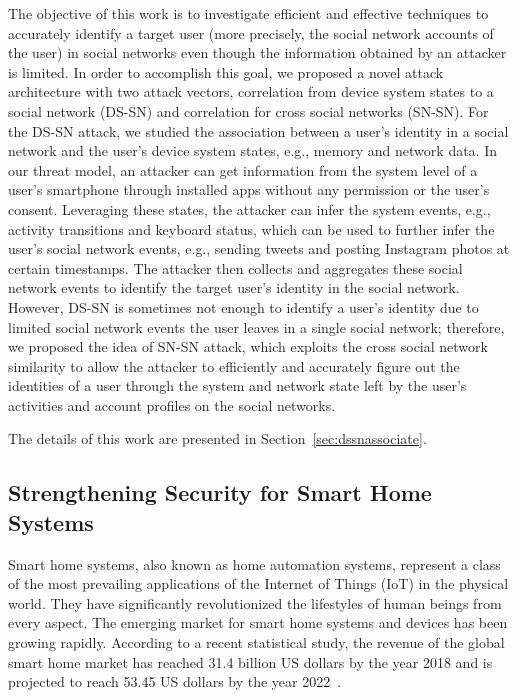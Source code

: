 \documentclass[letterpaper,12pt]{article}
\begin{document}
The objective of this work is to investigate efficient and effective techniques to accurately identify a target user (more precisely, the social network accounts of the user) in social networks even though the information obtained by an attacker is limited. 
In order to accomplish this goal, we proposed a novel attack architecture with two attack vectors, correlation from device system states to a social network (DS-SN) and correlation for cross social networks (SN-SN). For the DS-SN attack, we studied the association between a user's identity in a social network and the user's device system states, e.g., memory and network data. In our threat model, an attacker can get information from the system level of a user's smartphone through installed apps without any permission or the user's consent. Leveraging these states, the attacker can infer the system events, e.g., activity transitions and keyboard status, which can be used to further infer the user's social network events, e.g., sending tweets and posting Instagram photos at certain timestamps. The attacker then collects and aggregates these social network events to identify the target user's identity in the social network. However, DS-SN is sometimes not enough to identify a user's identity due to limited social network events the user leaves in a single social network; therefore, we proposed the idea of SN-SN attack, which exploits the cross social network similarity to allow the attacker to efficiently and accurately figure out the identities of a user through the system and network state left by the user's activities and account profiles on the social networks. 

The details of this work are presented in Section~\ref{sec:dssnassociate}. 

\subsection{Strengthening Security for Smart Home Systems}
Smart home systems, also known as home automation systems, represent a class of the most prevailing applications of the Internet of Things (IoT) in the physical world. They have significantly revolutionized the lifestyles of human beings from every aspect. The emerging market for smart home systems and devices has been growing rapidly. According to a recent statistical study, the revenue of the global smart home market has reached 31.4 billion US dollars by the year 2018 and is projected to reach 53.45 US dollars by the year 2022~\cite{smarthomemarket}. 
\end{document}
